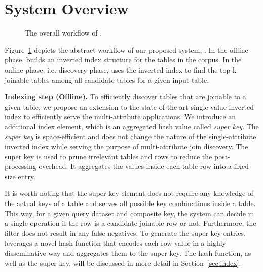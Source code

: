 
\section{System Overview} \label{sec:system}
\begin{figure}
    \caption{The overall workflow of \system.}
    \label{fig:architecture}
\end{figure}
Figure~\ref{fig:architecture} depicts the abstract workflow of our proposed system, \system. %
In the offline phase, \system builds an inverted index structure for the tables in the corpus. 
In the online phase, i.e. discovery phase, \system uses the inverted index to find the top-k joinable tables among all candidate tables for a given input table. 

\noindent\textbf{Indexing step (Offline).} To efficiently discover tables that are joinable to a given table, we propose an extension to the state-of-the-art single-value inverted index to efficiently serve the multi-attribute applications.
We introduce an additional index element, which is an aggregated hash value called \emph{super key}.
The \emph{super key} is space-efficient and does not change the nature of the single-attribute inverted index while serving the purpose of multi-attribute join discovery.
The super key is used to prune irrelevant tables and rows to reduce the post-processing overhead. It aggregates the values inside each table-row into a fixed-size entry.

It is worth noting that the super key element does not require any knowledge of the actual keys of a table and serves all possible key combinations inside a table.
This way, for a given query dataset and composite key, the system can decide in a single operation if the row is a candidate joinable row or not.
Furthermore, the filter does not result in any false negatives.
To generate the super key entries, \system leverages a novel hash function \hash that encodes each row value in a highly disseminative way and aggregates them to the super key. The hash function, as well as the super key, will be discussed in more detail in Section~\ref{sec:index}.

